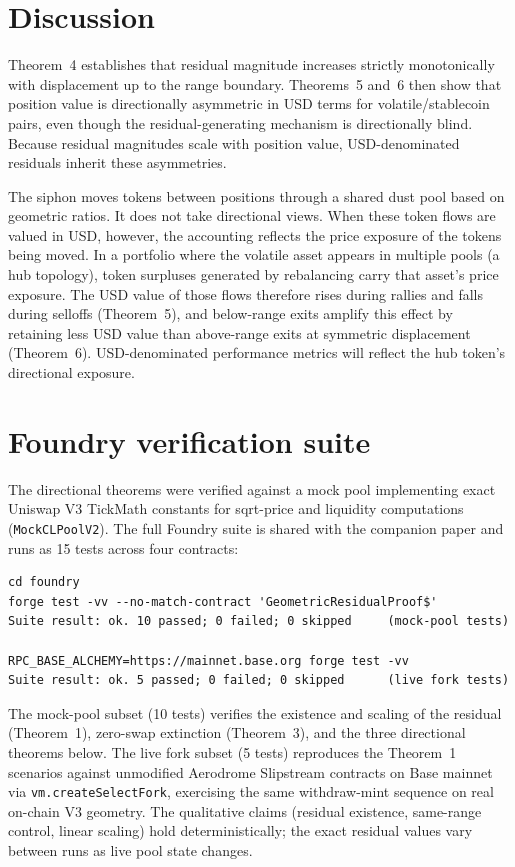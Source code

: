 \documentclass[11pt,a4paper]{article}
\theoremstyle{definition}
\begin{document}
\section{Discussion}

Theorem~4 establishes that residual magnitude increases strictly monotonically with displacement up to the range boundary. Theorems~5 and~6 then show that position value is directionally asymmetric in USD terms for volatile/stablecoin pairs, even though the residual-generating mechanism is directionally blind. Because residual magnitudes scale with position value, USD-denominated residuals inherit these asymmetries.

The siphon moves tokens between positions through a shared dust pool based on geometric ratios. It does not take directional views. When these token flows are valued in USD, however, the accounting reflects the price exposure of the tokens being moved. In a portfolio where the volatile asset appears in multiple pools (a hub topology), token surpluses generated by rebalancing carry that asset's price exposure. The USD value of those flows therefore rises during rallies and falls during selloffs (Theorem~5), and below-range exits amplify this effect by retaining less USD value than above-range exits at symmetric displacement (Theorem~6). USD-denominated performance metrics will reflect the hub token's directional exposure.

\section{Foundry verification suite}

The directional theorems were verified against a mock pool implementing exact Uniswap V3 TickMath constants for sqrt-price and liquidity computations (\texttt{MockCLPoolV2}). The full Foundry suite is shared with the companion paper \citep{ryan2026a} and runs as 15 tests across four contracts:

\begin{verbatim}
cd foundry
forge test -vv --no-match-contract 'GeometricResidualProof$'
Suite result: ok. 10 passed; 0 failed; 0 skipped     (mock-pool tests)

RPC_BASE_ALCHEMY=https://mainnet.base.org forge test -vv
Suite result: ok. 5 passed; 0 failed; 0 skipped      (live fork tests)
\end{verbatim}

The mock-pool subset (10 tests) verifies the existence and scaling of the residual (Theorem~1), zero-swap extinction (Theorem~3), and the three directional theorems below. The live fork subset (5 tests) reproduces the Theorem~1 scenarios against unmodified Aerodrome Slipstream contracts on Base mainnet via \texttt{vm.createSelectFork}, exercising the same withdraw-mint sequence on real on-chain V3 geometry. The qualitative claims (residual existence, same-range control, linear scaling) hold deterministically; the exact residual values vary between runs as live pool state changes.
\end{document}

